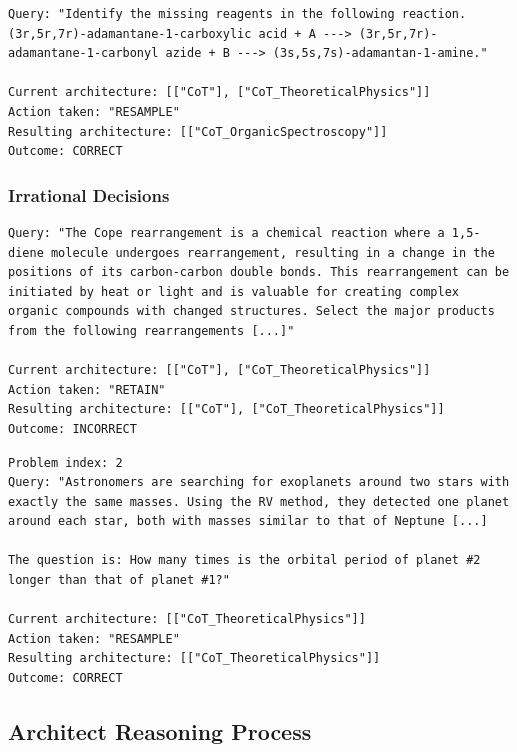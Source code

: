 \documentclass{article} %
\begin{document}
\begin{lstlisting}[style=customxml]
Query: "Identify the missing reagents in the following reaction.
(3r,5r,7r)-adamantane-1-carboxylic acid + A ---> (3r,5r,7r)-adamantane-1-carbonyl azide + B ---> (3s,5s,7s)-adamantan-1-amine."

Current architecture: [["CoT"], ["CoT_TheoreticalPhysics"]]
Action taken: "RESAMPLE"
Resulting architecture: [["CoT_OrganicSpectroscopy"]]
Outcome: CORRECT
\end{lstlisting}

\subsubsection{Irrational Decisions}

\begin{lstlisting}[style=customxml]
Query: "The Cope rearrangement is a chemical reaction where a 1,5-diene molecule undergoes rearrangement, resulting in a change in the positions of its carbon-carbon double bonds. This rearrangement can be initiated by heat or light and is valuable for creating complex organic compounds with changed structures. Select the major products from the following rearrangements [...]"

Current architecture: [["CoT"], ["CoT_TheoreticalPhysics"]]
Action taken: "RETAIN"
Resulting architecture: [["CoT"], ["CoT_TheoreticalPhysics"]]
Outcome: INCORRECT
\end{lstlisting}

\begin{lstlisting}[style=customxml]
Problem index: 2
Query: "Astronomers are searching for exoplanets around two stars with exactly the same masses. Using the RV method, they detected one planet around each star, both with masses similar to that of Neptune [...]

The question is: How many times is the orbital period of planet #2 longer than that of planet #1?"

Current architecture: [["CoT_TheoreticalPhysics"]]
Action taken: "RESAMPLE"
Resulting architecture: [["CoT_TheoreticalPhysics"]]
Outcome: CORRECT
\end{lstlisting}

\subsection{Architect Reasoning Process}
\label{app:architect_reasoning}
\end{document}
